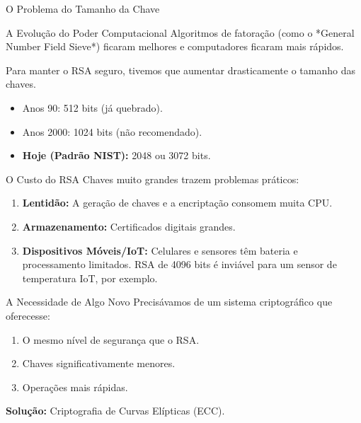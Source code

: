 \documentclass[aspectratio=169]{beamer}
\begin{document}
\begin{frame}{O Problema do Tamanho da Chave}
  \begin{alertblock}{A Evolução do Poder Computacional}
    Algoritmos de fatoração (como o *General Number Field Sieve*) ficaram melhores e computadores ficaram mais rápidos.
  \end{alertblock}
  
  Para manter o RSA seguro, tivemos que aumentar drasticamente o tamanho das chaves.
  
  \begin{itemize}
      \item Anos 90: 512 bits (já quebrado).
      \item Anos 2000: 1024 bits (não recomendado).
      \item \textbf{Hoje (Padrão NIST):} 2048 ou 3072 bits.
  \end{itemize}
\end{frame}

\begin{frame}{O Custo do RSA}
  Chaves muito grandes trazem problemas práticos:
  \begin{enumerate}
      \item \textbf{Lentidão:} A geração de chaves e a encriptação consomem muita CPU.
      \item \textbf{Armazenamento:} Certificados digitais grandes.
      \item \textbf{Dispositivos Móveis/IoT:} Celulares e sensores têm bateria e processamento limitados. RSA de 4096 bits é inviável para um sensor de temperatura IoT, por exemplo.
  \end{enumerate}
\end{frame}

\begin{frame}{A Necessidade de Algo Novo}
  Precisávamos de um sistema criptográfico que oferecesse:
  
  \begin{enumerate}
      \item O mesmo nível de segurança que o RSA.
      \item Chaves significativamente menores.
      \item Operações mais rápidas.
  \end{enumerate}
  
  \vspace{0.5cm}
  \textbf{Solução:} Criptografia de Curvas Elípticas (ECC).
\end{frame}
\end{document}
